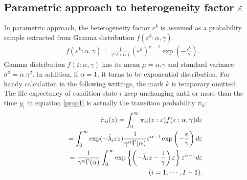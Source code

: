 \subsection{Parametric approach to heterogeneity factor $\varepsilon$}
\label{642}
In parametric approach, the heterogeneity factor $\varepsilon^k$ is assumed as a probability sample extracted from Gamma distribution $f(\varepsilon^k:\alpha,\gamma)$:  
\begin{eqnarray}
&& f(\varepsilon^k:\alpha,\gamma)=\frac{1}{\gamma^\alpha \Gamma(\alpha)}\left(\varepsilon^k\right)^{\alpha-1}\exp\left(-\frac{\varepsilon^k}{\gamma}\right). \label{gamma}
\end{eqnarray}
Gamma distribution $f(\varepsilon:\alpha,\gamma)$ has its mean $\mu=\alpha.\gamma$ and standard variance $\sigma^2=\alpha.\gamma^2$. In addition, if $\alpha=1$, it turns to be exponential distribution. For handy calculation in the following writings, the mark $k$ is temporary omitted. The life expectancy of condition state $i$ keep unchanging until or more than the time $y_i$ in equation \ref{prop1} is actually the transition probability $\pi_{ii}$:
\begin{eqnarray}
&& \tilde{\pi}_{ii}(z)=\int_0^\infty \pi_{ii}(z:\varepsilon)f(\varepsilon:\alpha,\gamma)d\varepsilon \nonumber \\
&& \hspace{5mm} =\int_0^\infty \exp(-\tilde{\lambda}_i\varepsilon z)
\frac{1}{\gamma^\alpha \Gamma(\alpha)}\varepsilon^{\alpha-1}\exp\left(-\frac{\varepsilon}{\gamma}\right)d\varepsilon \nonumber \\
&& \hspace{5mm}=\frac{1}{\gamma^\alpha \Gamma(\alpha)}\int_0^\infty \exp\left\{\left(-\tilde{\lambda}_i z-\frac{1}{\gamma}\right)\varepsilon\right\}\varepsilon^{\alpha-1}d\varepsilon \nonumber\\
&& \hspace{10mm}(i=1,\cdots,I-1) . \label{prp11}
\end{eqnarray}

